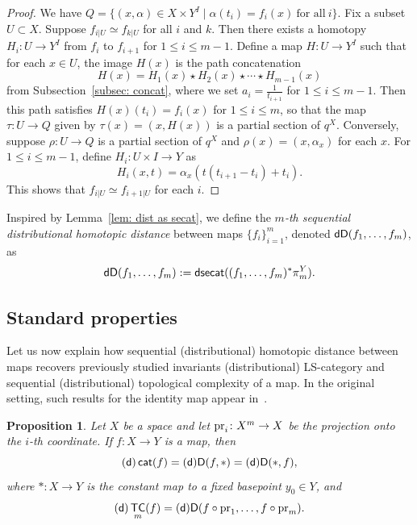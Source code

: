 \documentclass[amscd,amssymb,verbatim,10pt]{amsart}
\numberwithin{equation}{section}
\theoremstyle{plain}
\newtheorem{proposition}[theorem]{Proposition}
\theoremstyle{definition}
\DeclareMathOperator{\cat}{{\mathsf{cat}}}
\DeclareMathOperator{\TC}{{\mathsf{TC}}}
\DeclareMathOperator{\dsecat}{{\mathsf{dsecat}}}
\def\pr{\protect\operatorname{pr}}
\newcommand{\D}{{\sf {D}}}
\newcommand{\sd}{{(\sf {d})}}
\newcommand{\dD}{{\sf {dD}}}
\begin{document}
\begin{proof}
We have $Q=\{(x,\alpha)\in X\times Y^I\mid \alpha(t_i)=f_i(x)\ \text{for all}\ i\}$. Fix a subset $U\subset X$. Suppose $f_{i|U}\simeq f_{k|U}$ for all $i$ and $k$. Then there exists a homotopy $H_i\colon U\to Y^I$ from $f_i$ to $f_{i+1}$ for $1\le i \le m-1$. Define a map $H\colon U\to Y^I$ such that for each $x\in U$, the image $H(x)$ is the path concatenation
\[
H(x)=H_1(x)\star H_2(x)\star\cdots\star H_{m-1}(x)
\]
from Subsection~\ref{subsec: concat}, where we set $a_i=\tfrac{1}{t_{i+1}}$ for $1\le i\le m-1$. Then this path satisfies $H(x)(t_i)=f_i(x)$ for $1\le i \le m$, so that the map $\tau\colon U\to Q$ given by $\tau(x)=(x,H(x))$ is a partial section of $q^X$. Conversely, suppose $\rho\colon U\to Q$ is a partial section of $q^X$ and $\rho(x)=(x,\alpha_x)$ for each $x$. For $1\le i\le m-1$, define $H_i\colon U \times I\to Y$ as
\[
H_i(x,t)=\alpha_x(t(t_{i+1}-t_i)+t_i).
\]
This shows that $f_{i|U}\simeq f_{i+1|U}$ for each $i$.
\end{proof}

Inspired by Lemma~\ref{lem: dist as secat}, we define the $m$\emph{-th sequential distributional homotopic distance} between maps $\{f_i\}_{i=1}^m$, denoted $\dD(f_1,\dots,f_m)$, as
\[
\dD(f_1,\dots,f_m):=\dsecat((f_1,\dots,f_m)^*\pi^Y_m).
\]

\subsection{Standard properties}
Let us now explain how sequential (distributional) homotopic distance between maps recovers previously studied invariants (distributional) LS-category and sequential (distributional) topological complexity of a map. In the original setting, such results for the identity map appear in~\cite{MM,BV}.

\begin{proposition}\label{prop: recovering tcf}
    Let $X$ be a space and let $\pr_i\colon X^m\to X$ be the projection onto the $i$-th coordinate. If $f\colon X\to Y$ is a map, then 
    \[
    \sd\cat(f)=\sd\D(f,\ast)=\sd\D(\ast,f),
    \]
    where $\ast\colon X\to Y$ is the constant map to a fixed basepoint $y_0\in Y$, and
    \[
    \sd\TC_m(f)=\sd\D(f\circ \pr_1,\dots,f\circ\pr_m).
    \]
\end{proposition}
\end{document}
